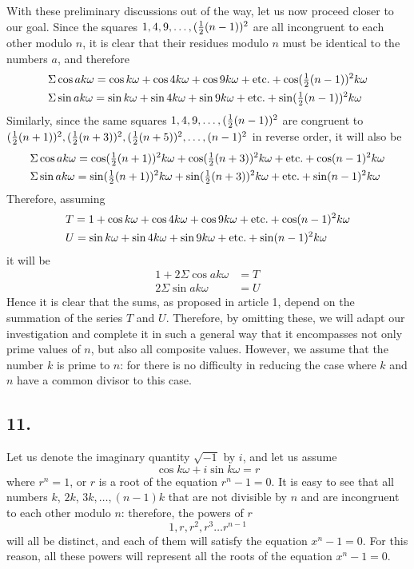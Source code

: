 \documentclass[twoside,12pt, showframe]{memoir}
\let\oldfrac\frac
\def\frac#1#2{\mathchoice{\tfrac{#1}{#2}}{\oldfrac{#1}{#2}}{\genfrac{}{}{}{2}{#1}{#2\mathstrut}}{\genfrac{}{}{}{3}{#1}{#2\mathstrut}}}
\begin{document}
With these preliminary discussions out of the way, let us now proceed closer to our goal. Since the squares \(1, 4, 9, \ldots, (\frac{1}{2}(n-1))^2\) are all incongruent to each other modulo \(n\), it is clear that their residues modulo \(n\) must be identical to the numbers \(a\), and therefore
\[\begin{aligned}
&\Sigma \cos a k \omega=\cos k \omega+\cos 4 k \omega+\cos 9 k \omega+\text{etc.}+\cos (\frac{1}{2}(n-1))^2 k \omega \\
&\Sigma \sin a k \omega=\sin k \omega+\sin 4 k \omega+\sin 9 k \omega+\text{etc.}+\sin (\frac{1}{2}(n-1))^2 k \omega
\end{aligned}\]
Similarly, since the same squares \(1, 4, 9, \ldots, (\frac{1}{2}(n-1))^2\) are congruent to \((\frac{1}{2}(n+1))^2, (\frac{1}{2}(n+3))^2, (\frac{1}{2}(n+5))^2, \ldots, (n-1)^2\) in reverse order, it will also be
\[\begin{aligned}
&\Sigma \cos a k \omega=\cos (\frac{1}{2}(n+1))^2 k \omega+\cos (\frac{1}{2}(n+3))^2 k \omega+\text{etc.}+\cos (n-1)^2 k \omega \\
&\Sigma \sin a k \omega=\sin (\frac{1}{2}(n+1))^2 k \omega+\sin (\frac{1}{2}(n+3))^2 k \omega+\text{etc.}+\sin (n-1)^2 k \omega
\end{aligned}\]
Therefore, assuming
\[\begin{alignedat}[t]{2}
&T=1+\cos k \omega+\cos 4 k \omega+\cos 9 k \omega+\text{etc.}+\cos (n-1)^2 k \omega \\
& U= \sin k \omega+\sin 4 k \omega+\sin 9 k \omega+\text{etc.}+\sin (n-1)^2 k \omega
\end{alignedat}\]
it will be
\[\begin{aligned}
1+2 \Sigma \cos a k \omega & =T \\
2 \Sigma \sin a k \omega & =U
\end{aligned}\]
Hence it is clear that the sums, as proposed in article 1, depend on the summation of the series \(T\) and \(U\). Therefore, by omitting these, we will adapt our investigation and complete it in such a general way that it encompasses not only prime values of \(n\), but also all composite values. However, we assume that the number \(k\) is prime to \(n\): for there is no difficulty in reducing the case where \(k\) and \(n\) have a common divisor to this case.
%

\subsection*{11.}
Let us denote the imaginary quantity $\sqrt{-1}$ by $i$, and let us assume
\[\cos k \omega+i \sin k \omega=r\]
where $r^{n}=1$, or $r$ is a root of the equation $r^{n}-1=0$. It is easy to see that all numbers $k$, $2 k$, $3 k, \ldots, (n-1) k$ that are not divisible by $n$ and are incongruent to each other modulo $n$: therefore, the powers of $r$
\[1, r, r^{2}, r^{3} \ldots r^{n-1}\]
will all be distinct, and each of them will satisfy the equation $x^{n}-1=0$. For this reason, all these powers will represent all the roots of the equation $x^{n}-1=0$.
%
\end{document}
